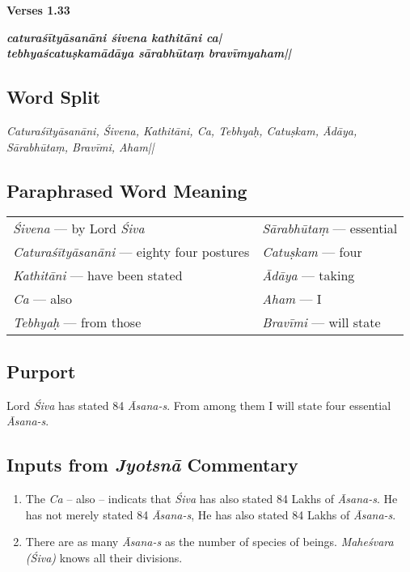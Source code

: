 \noindent 
\textbf{Verses 1.33}

\begin{shloka}
\textit{\textbf{caturaśītyāsanāni śivena kathitāni ca|}\\
\textbf{tebhyaścatuṣkamādāya sārabhūtaṃ bravīmyaham||}}
\end{shloka}

\subsection*{Word Split}

\textit{Caturaśītyāsanāni, Śivena, Kathitāni, Ca, Tebhyaḥ, Catuṣkam, Ādāya, Sārabhūtaṃ, Bravīmi, Aham||}

\subsection*{Paraphrased Word Meaning}

\begin{longtable}{>{\noindent\raggedright}p{5cm}>{\noindent\raggedright}p{5cm}}
\textit{Śivena} --- by Lord \textit{Śiva} & \textit{Sārabhūtaṃ} --- essential\tabularnewline
\textit{Caturaśītyāsanāni} --- eighty four postures  & \textit{Catuṣkam} --- four\tabularnewline
\textit{Kathitāni} --- have been stated  & \textit{Ādāya} --- taking\tabularnewline
\textit{Ca} --- also & \textit{Aham}  --- I\tabularnewline
\textit{Tebhyaḥ} --- from those & \textit{Bravīmi} --- will state
\end{longtable}

\subsection*{Purport}

Lord \textit{Śiva} has stated 84 \textit{Āsana-s}. From among them I will state four essential \textit{Āsana-s}.

\subsection*{Inputs from \textit{Jyotsnā} Commentary}

\begin{enumerate}
\item The \textit{Ca} – also – indicats that \textit{Śiva} has also stated 84 Lakhs of \textit{Āsana-s}. He has not merely stated 84 \textit{Āsana-s}, He has also stated 84 Lakhs of \textit{Āsana-s}. 
\item There are as many \textit{Āsana-s} as the number of species of beings. \textit{Maheśvara (Śiva)} knows all their divisions. 
\end{enumerate}

